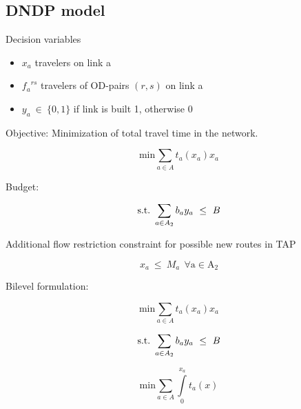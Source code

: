 \documentclass[a4paper, 12pt]{article}
\begin{document}
\subsection{DNDP model}
Decision variables
\begin{itemize}
\item $x_{a}$ travelers on link a
\item ${f_{a}}^{rs}$ travelers of OD-pairs $\left(r,s\right)$ on link a
\item $y_{a}\ \in\ {\{}0,1{\}}$ if link is built 1, otherwise 0
\end{itemize}
Objective: Minimization of total travel time in the network.
\begin{large}
\boldmath\begin{equation*}
\mathrm{min}\sum_{a\in{A}} t_{a}\left(x_{a}\right)x_{a} 
\end{equation*}
\end{large}
Budget:
\begin{large}
\boldmath\begin{equation*}
\mathrm{s.t.}\ \sum_{a\in{A_{2}}} b_{a}y_{a}\ \leq \ B \\
\end{equation*}
\end{large}
Additional flow restriction constraint for possible new routes in TAP
\begin{large}
\boldmath\begin{equation*}
x_{a}\ \leq\ M_{a}\ \ \mathrm{\forall{a}\in{A_{2}}}
\end{equation*}
\end{large} 
Bilevel formulation:
\begin{large}
\boldmath\begin{equation*}
\mathrm{min}\sum_{a\in{A}} t_{a}\left(x_{a}\right)x_{a} 
\end{equation*}
\end{large}
\begin{large}
\boldmath\begin{equation*}
\mathrm{s.t.}\ \sum_{a\in{A_{2}}} b_{a}y_{a}\ \leq \ B \\
\end{equation*}
\end{large}
\begin{large}
\boldmath\begin{equation*}
\mathrm{min}\sum_{a\in{A}} \int\limits_{0}^{x_a}t_{a}\left(x\right)
\end{equation*}
\end{large}
\end{document}
